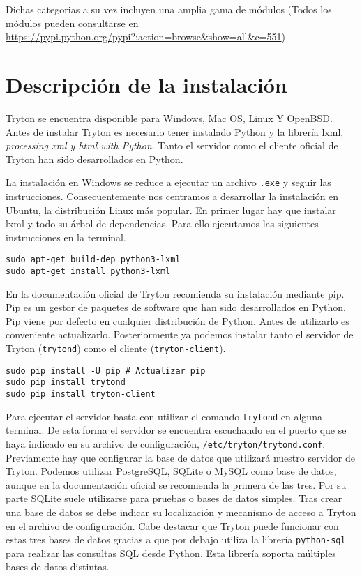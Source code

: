 \documentclass{article}
\begin{document}
Dichas categorias a su vez incluyen una amplia gama de módulos (Todos los módulos pueden consultarse en \url{https://pypi.python.org/pypi?:action=browse&show=all&c=551})


\section{Descripción de la instalación}

Tryton se encuentra disponible para Windows, Mac OS, Linux Y OpenBSD. Antes de instalar Tryton es necesario tener instalado Python y la librería lxml, \emph{processing xml y html with Python}. Tanto el servidor como el cliente oficial de Tryton han sido desarrollados en Python.

La instalación en Windows se reduce a ejecutar un archivo \texttt{.exe} y seguir las instrucciones. Consecuentemente nos centramos a desarrollar la instalación en Ubuntu, la distribución Linux más popular. En primer lugar hay que instalar lxml y todo su árbol de dependencias. Para ello ejecutamos las siguientes instrucciones en la terminal.

\begin{verbatim}
sudo apt-get build-dep python3-lxml
sudo apt-get install python3-lxml
\end{verbatim}

En la documentación oficial de Tryton recomienda su instalación mediante pip. Pip es un gestor de paquetes de software que han sido desarrollados en Python.  Pip viene por defecto en cualquier distribución de Python. Antes de utilizarlo es conveniente actualizarlo. Posteriormente ya podemos instalar tanto el servidor de Tryton (\texttt{trytond}) como el cliente (\texttt{tryton-client}).

\begin{verbatim}
sudo pip install -U pip # Actualizar pip
sudo pip install trytond
sudo pip install tryton-client
\end{verbatim}

Para ejecutar el servidor basta con utilizar el comando \texttt{trytond} en alguna terminal. De esta forma el servidor se encuentra escuchando en el puerto que se haya indicado en su archivo de configuración, \texttt{/etc/tryton/trytond.conf}. Previamente hay que configurar la base de datos que utilizará nuestro servidor de Tryton. Podemos utilizar PostgreSQL, SQLite o MySQL como base de datos, aunque en la documentación oficial se recomienda la primera de las tres. Por su parte SQLite suele utilizarse para pruebas o bases de datos simples. Tras crear una base de datos se debe indicar su localización y mecanismo de acceso a Tryton en el archivo de configuración. Cabe destacar que Tryton puede funcionar con estas tres bases de datos gracias a que por debajo utiliza la librería \texttt{python-sql} para realizar las consultas SQL desde Python. Esta librería soporta múltiples bases de datos distintas.
\end{document}
